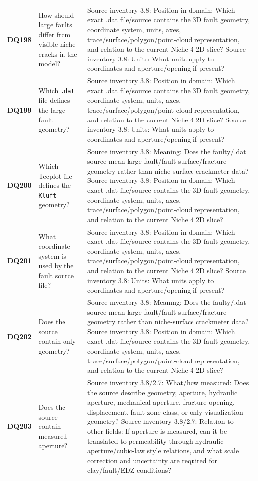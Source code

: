 \begin{longtable}{@{}L{0.09\textwidth} L{0.31\textwidth} L{0.52\textwidth}@{}}
\addlinespace[0.18em]
\textbf{DQ198} & How should large faults differ from visible niche cracks in the model? & Source inventory 3.8: Position in domain: Which exact .dat file/source contains the 3D fault geometry, coordinate system, units, axes, trace/surface/polygon/point-cloud representation, and relation to the current Niche 4 2D slice? Source inventory 3.8: Units: What units apply to coordinates and aperture/opening if present?\\
\addlinespace[0.18em]
\textbf{DQ199} & Which \texttt{.dat} file defines the large fault geometry? & Source inventory 3.8: Position in domain: Which exact .dat file/source contains the 3D fault geometry, coordinate system, units, axes, trace/surface/polygon/point-cloud representation, and relation to the current Niche 4 2D slice? Source inventory 3.8: Units: What units apply to coordinates and aperture/opening if present?\\
\addlinespace[0.18em]
\textbf{DQ200} & Which Tecplot file defines the \texttt{Kluft} geometry? & Source inventory 3.8: Meaning: Does the faulty/.dat source mean large fault/fault-surface/fracture geometry rather than niche-surface crackmeter data? Source inventory 3.8: Position in domain: Which exact .dat file/source contains the 3D fault geometry, coordinate system, units, axes, trace/surface/polygon/point-cloud representation, and relation to the current Niche 4 2D slice?\\
\addlinespace[0.18em]
\textbf{DQ201} & What coordinate system is used by the fault source file? & Source inventory 3.8: Position in domain: Which exact .dat file/source contains the 3D fault geometry, coordinate system, units, axes, trace/surface/polygon/point-cloud representation, and relation to the current Niche 4 2D slice? Source inventory 3.8: Units: What units apply to coordinates and aperture/opening if present?\\
\addlinespace[0.18em]
\textbf{DQ202} & Does the source contain only geometry? & Source inventory 3.8: Meaning: Does the faulty/.dat source mean large fault/fault-surface/fracture geometry rather than niche-surface crackmeter data? Source inventory 3.8: Position in domain: Which exact .dat file/source contains the 3D fault geometry, coordinate system, units, axes, trace/surface/polygon/point-cloud representation, and relation to the current Niche 4 2D slice?\\
\addlinespace[0.18em]
\textbf{DQ203} & Does the source contain measured aperture? & Source inventory 3.8/2.7: What/how measured: Does the source describe geometry, aperture, hydraulic aperture, mechanical aperture, fracture opening, displacement, fault-zone class, or only visualization geometry? Source inventory 3.8/2.7: Relation to other fields: If aperture is measured, can it be translated to permeability through hydraulic-aperture/cubic-law style relations, and what scale correction and uncertainty are required for clay/fault/EDZ conditions?\\

\end{longtable}
